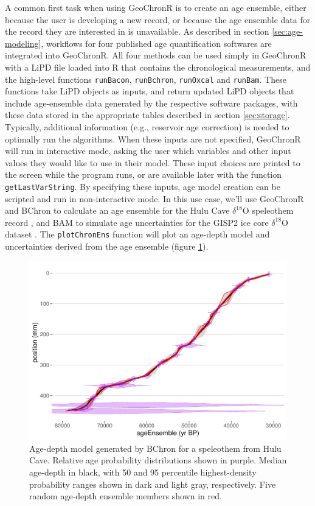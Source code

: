\documentclass[gchron, manuscript]{copernicus}
\begin{document}
A common first task when using GeoChronR is to create an age ensemble, either because the user is developing a new record, or because the age ensemble data for the record they are interested in is unavailable.
As described in section \ref{sec:age-modeling}, workflows for four published age quantification softwares are integrated into GeoChronR.
All four methods can be used simply in GeoChronR with a LiPD file loaded into R that contains the chronological measurements, and the high-level functions \texttt{runBacon}, \texttt{runBchron}, \texttt{runOxcal} and \texttt{runBam}.
These functions take LiPD objects as inputs, and return updated LiPD objects that include age-ensemble data generated by the respective software packages, with these data stored in the appropriate tables described in section \ref{sec:storage}.
Typically, additional information (e.g., reservoir age correction) is needed to optimally run the algorithms.
When these inputs are not specified, GeoChronR will run in interactive mode, asking the user which variables and other input values they would like to use in their model.
These input choices are printed to the screen while the program runs, or are available later with the function \texttt{getLastVarString}.
By specifying these inputs, age model creation can be scripted and run in non-interactive mode.
In this use case, we'll use GeoChronR and BChron \citep{parnell2008flexible} to calculate an age ensemble for the Hulu Cave \(\delta^{18}\)O speleothem record \citep{hulu2001}, and BAM \citep{BAM} to simulate age uncertainties for the GISP2 ice core \(\delta^{18}\)O dataset \citep{alley2000}.
The \texttt{plotChronEns} function will plot an age-depth model and uncertainties derived from the age ensemble (figure \ref{fig:age-model}).

\begin{figure}
\includegraphics[width=12cm]{geoChronR-paper_files/figure-latex/age-model-1} \caption{Age-depth model generated by BChron for a speleothem from Hulu Cave. Relative age probability distributions shown in purple. Median age-depth in black, with 50 and 95 percentile highest-density probability ranges shown in dark and light gray, respectively. Five random age-depth ensemble members shown in red.}\label{fig:age-model}
\end{figure}
\end{document}

